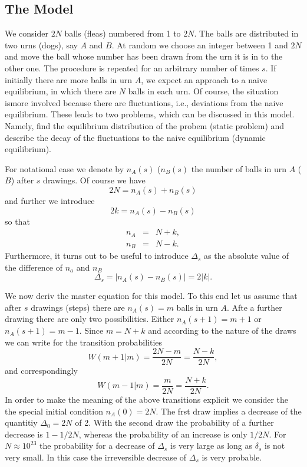 \subsection{The Model}
We consider $2N$ balls (fleas) numbered from 1 to $2N$. The balls are
distributed in two urns (dogs), say $A$ and $B$. At random we choose an
integer between 1 and $2N$ and move the ball whose number has been drawn from 
the urn it is in to the other one. The procedure is repeated for an arbitrary
number of times $s$. If initially there are more balls in urn $A$, we expect
an approach to a naive  equilibrium, in which there are $N$ balls in each urn.
Of course, the situation ismore involved because there are fluctuations, i.e.,
deviations from the naive equilibrium. These leads to two problems, which can
be discussed in this model. Namely, find the equilibrium distribution of the
probem (static problem) and describe the decay of the fluctuations to the
naive equilibrium (dynamic equilibrium).  


For notational ease we denote by $n_A(s)$ ($n_B(s)$ the 
number of balls in urn $A$ ($B$) after $s$ drawings. Of course we have
\begin{displaymath}
  2N = n_A(s) + n_B(s)
\end{displaymath}
and further we introduce
\begin{displaymath}
  2 k = n_A(s) - n_B(s)
\end{displaymath}
so that
\begin{eqnarray*}
  n_A & = & N+k, \\
  n_B & = & N-k.
\end{eqnarray*}
Furthermore, it turns out to be useful to introduce $\Delta_s$ as the  
absolute value of the difference of $n_a$ and $n_B$
\begin{displaymath}
  \Delta_s = |n_A(s) - n_B(s) | = 2 |k|.
\end{displaymath}

We now deriv the master equation for this model.
To this end let us assume that after $s$ drawings (steps) there are 
$n_A(s) = m$  balls in urn $A$. Afte a further drawing there are only two
possibilities. Either $n_A(s+1) = m+1$ or $n_A(s+1) = m-1$. Since $m=N+k$ and
according to the nature of the draws we
can write for the transition probabilities
\begin{equation}
\label{eq:NonWEhren1}
  W(m+1|m) = \frac{2N-m}{2N} = \frac{N-k}{2N},
\end{equation}
and correspondingly
\begin{equation}
\label{eq:NonWEhren2}
   W(m-1|m) = \frac{m}{2N} = \frac{N+k}{2N}.
\end{equation}
In order to make the meaning of the above transitions explicit we consider the
the special initial condition $n_A(0) = 2N$. The frst draw implies a decrease
of the quantitiy $\Delta_0=2N$ of 2. With the second draw the probability of a
further decrease is $1-1/2N$, whereas the probability of an increase is only
$1/2N$.  For $N \approx 10^{23}$ the probability for a decrease of $\Delta_s$
is very large as long as $\delta_s$ is not very small. In this case the
irreversible decrease of $\Delta_s$ is very probable. 

